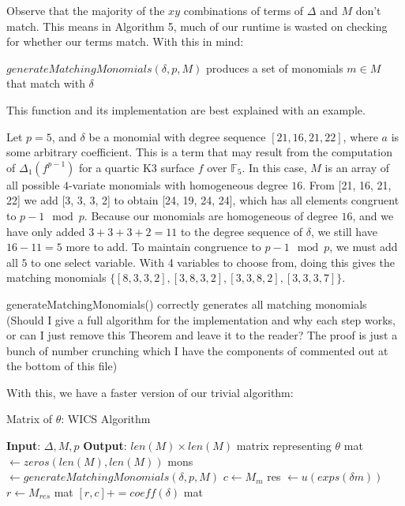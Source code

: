 Observe that the majority of the $xy$ combinations of terms of $\Delta$ and $M$ don't match. This means in
Algorithm 5, much of our runtime is wasted on checking for whether our terms match. With this in mind:

\begin{defn}
    $generateMatchingMonomials(\delta, p, M)$ produces a set of monomials $m \in M$ that match with $\delta$
\end{defn}

This function and its implementation are best explained with an example.

\begin{ex}
    Let $p = 5$, and $\delta$ be a monomial with degree sequence $[21, 16, 21, 22]$, where $a$ is some arbitrary coefficient. This is a term that may
    result from the computation of $\Delta_1(f^{p - 1})$ for a quartic K3 surface $f$ over $\mathbb{F}_5$. In this case, $M$ is an array
    of all possible $4$-variate monomials with homogeneous degree $16$. From [21, 16, 21, 22] we add [3, 3, 3, 2] to obtain [24, 19, 24, 24], which
    has all elements congruent to $p-1 \mod p$. Because our monomials are homogeneous of degree $16$, and
    we have only added $3 + 3 + 3 + 2 = 11$ to the degree sequence of $\delta$, we still have $16 - 11 = 5$ more to add.
    To maintain congruence to $p-1 \mod p$, we must add all $5$ to one select variable. With 4 variables to choose from, doing this gives the
    matching monomials $\{[8, 3, 3, 2], [3, 8, 3, 2], [3, 3, 8, 2], [3, 3, 3, 7]\}$.
\end{ex}

\begin{thm}
    generateMatchingMonomials() correctly generates all matching monomials (Should I give a full algorithm for the implementation and why each step works, or can I just remove this Theorem and leave it to the reader? The proof is just a bunch of number crunching which I have the components of commented out at the bottom of this file)
\end{thm}

With this, we have a faster version of our trivial algorithm:

\begin{algorithm}[H]
    \caption{Matrix of $\theta$: WICS Algorithm}
    \label{alg:matrix:WICS}
    \begin{algorithmic}[1]
    \State \textbf{Input}: $\Delta, M, p$
    \State \textbf{Output}: $len(M) \times len(M)$ matrix representing $\theta$
    \State mat $\gets zeros(len(M), len(M))$
    \For{$\delta \in \Delta$}
        \State mons $\gets generateMatchingMonomials(\delta, p, M)$
            \State $c \gets M_m$
            \State res $\gets u(exps(\delta m))$
            \State $r \gets M_{res}$
            \State mat $[r, c] += coeff(\delta)$
        \EndFor
    \EndFor
    \State \Return mat
    \end{algorithmic}
\end{algorithm}

